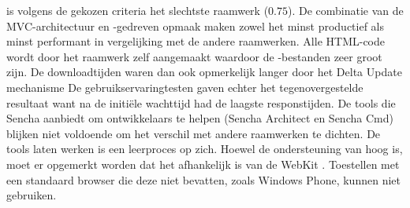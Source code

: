 \st{} is volgens de gekozen criteria het slechtste raamwerk ($0.75$).
De combinatie van de MVC-architectuur en \js-gedreven opmaak maken \st{} zowel het minst productief als minst performant in vergelijking met de andere raamwerken.
Alle HTML-code wordt door het raamwerk zelf aangemaakt waardoor de \js-bestanden zeer groot zijn.
De downloadtijden waren dan ook opmerkelijk langer door het Delta Update mechanisme
De gebruikservaringtesten gaven echter het tegenovergestelde resultaat want na de initiële wachttijd had \st{} de laagste responstijden.
De tools die Sencha aanbiedt om ontwikkelaars te helpen (Sencha Architect en Sencha Cmd) blijken niet voldoende om het verschil met andere raamwerken te dichten.
De tools laten werken is een leerproces op zich.
Hoewel de ondersteuning van \st{} hoog is, moet er opgemerkt worden dat het afhankelijk is van de WebKit .
Toestellen met een standaard browser die deze  niet bevatten, zoals Windows Phone,  kunnen \st{} niet gebruiken.














